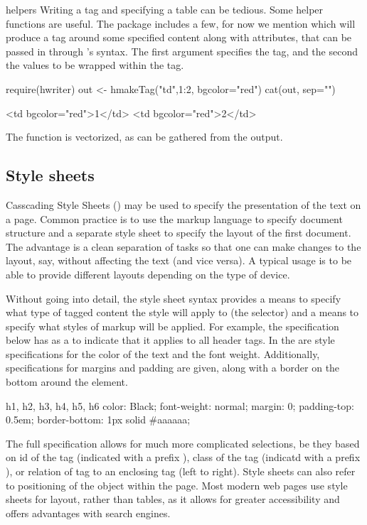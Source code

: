 \begin{example}{\R\/ helpers}{}
  Writing a tag and specifying a table can be tedious. Some helper
  functions are useful. The  package includes a few, for
  now we mention  which will produce a tag around
  some specified content along with attributes, that can be passed in
  through \R's  syntax. The first argument specifies
  the tag, and the second the values to be wrapped within the tag.
\begin{Schunk}
\begin{Sinput}
 require(hwriter)
 out <- hmakeTag("td",1:2, bgcolor="red")
 cat(out, sep="\n")
\end{Sinput}
\begin{Soutput}
<td bgcolor="red">1</td>
<td bgcolor="red">2</td>
\end{Soutput}
\end{Schunk}
The function is vectorized, as can be gathered from the output.
\end{example}


\subsection{Style sheets}
\label{sec:style-sheets}


Casscading Style Sheets () may be used to specify the
presentation of the text on a page. Common practice is to use the
markup language to specify document structure and a separate style sheet
to specify the layout of the first document. The advantage is a clean
separation of tasks so that one can make changes to the layout, say,
without affecting the text (and vice versa). A typical usage is to be
able to provide different layouts depending on the type of device.

Without going into detail, the style sheet syntax provides a means to
specify what type of tagged content the style will apply to (the
selector) and a means to specify what styles of markup will be
applied. For example, the specification below has
 as a  to indicate that it
applies to all header tags. In the  are style
specifications for the color of the text and the font
weight. Additionally, specifications for margins and padding are
given, along with a border on the bottom around the element.
\begin{HTMLinput}
  h1, h2, h3, h4, h5, h6 {
    color: Black;
    font-weight: normal;
    margin: 0;
    padding-top: 0.5em;
    border-bottom: 1px solid #aaaaaa;
}
\end{HTMLinput}
The full specification allows for much more complicated selections, be
they based on id of the tag (indicated with a prefix \code{\#}), class
of the tag (indicatd with a prefix ), or relation of tag to an
enclosing tag (left to right).  Style sheets can also refer to
positioning of the object within the page. Most modern web pages use
style sheets for layout, rather than tables, as it allows for greater
accessibility and offers advantages with search engines.


